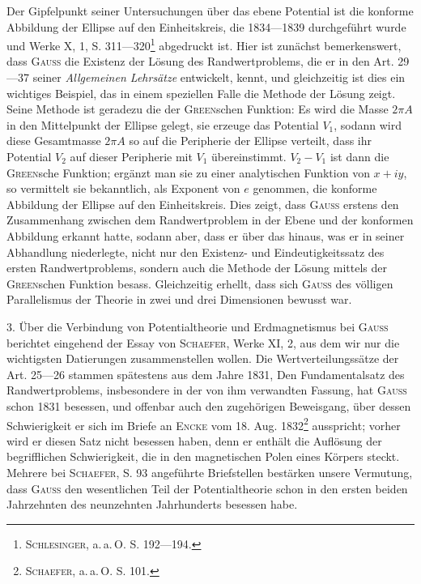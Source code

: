 Der Gipfelpunkt seiner Untersuchungen über das ebene Potential ist die
konforme Abbildung der Ellipse auf den Einheitskreis, die 1834—1839 durchgeführt
wurde und Werke X, 1, S. 311—320\footnote{\textsc{Schlesinger}, a.\,a.\,O. S. 192—194.} abgedruckt ist. Hier ist zunächst
bemerkenswert, dass \textsc{Gauss} die Existenz der Lösung des Randwertproblems,
die er in den Art. 29—37 seiner \textit{Allgemeinen Lehrsätze} entwickelt,
kennt, und gleichzeitig ist dies ein wichtiges Beispiel, das in einem speziellen
Falle die Methode der Lösung zeigt. Seine Methode ist geradezu die der \textsc{Green}schen
Funktion: Es wird die Masse \(2\pi A\) in den Mittelpunkt der Ellipse gelegt,
sie erzeuge das Potential \(V_1\), sodann wird diese Gesamtmasse \(2\pi A\) so
auf die Peripherie der Ellipse verteilt, dass ihr Potential \(V_2\) auf dieser Peripherie
mit \(V_1\) übereinstimmt. \(V_2-V_1\) ist dann die \textsc{Green}sche Funktion; ergänzt
man sie zu einer analytischen Funktion von \(x+iy\), so vermittelt sie bekanntlich,
als Exponent von \(e\) genommen, die konforme Abbildung der Ellipse auf den
Einheitskreis. Dies zeigt, dass \textsc{Gauss} erstens den Zusammenhang zwischen
dem Randwertproblem in der Ebene und der konformen Abbildung erkannt
hatte, sodann aber, dass er über das hinaus, was er in seiner Abhandlung niederlegte,
nicht nur den Existenz- und Eindeutigkeitssatz des ersten Randwertproblems,
sondern auch die Methode der Lösung mittels der \textsc{Green}schen
Funktion besass. Gleichzeitig erhellt, dass sich \textsc{Gauss} des völligen Parallelismus
der Theorie in zwei und drei Dimensionen bewusst war.

3. Über die Verbindung von Potentialtheorie und Erdmagnetismus bei
\textsc{Gauss} berichtet eingehend der Essay von \textsc{Schaefer}, Werke XI, 2, aus dem
wir nur die wichtigsten Datierungen zusammenstellen wollen. Die Wertverteilungssätze
der Art. 25—26 stammen spätestens aus dem Jahre 1831,
Den Fundamentalsatz des Randwertproblems, insbesondere in der von ihm
\clearpage{}
\HistoricalFoot{}{7\textsuperscript{*}}
\noindent verwandten Fassung, hat \textsc{Gauss} schon 1831 besessen, und offenbar auch den
zugehörigen Beweisgang, über dessen Schwierigkeit er sich im Briefe an \textsc{Encke}
vom 18. Aug. 1832\footnote{\textsc{Schaefer}, a.\,a.\,O. S. 101.} ausspricht; vorher wird er diesen Satz nicht besessen
haben, denn er enthält die Auflösung der begrifflichen Schwierigkeit, die in
den magnetischen Polen eines Körpers steckt. Mehrere bei \textsc{Schaefer}, S. 93
angeführte Briefstellen bestärken unsere Vermutung, dass \textsc{Gauss} den wesentlichen
Teil der Potentialtheorie schon in den ersten beiden Jahrzehnten des
neunzehnten Jahrhunderts besessen habe.

